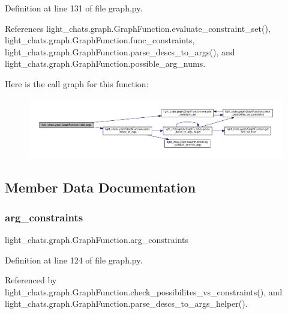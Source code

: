 Definition at line 131 of file graph.\+py.



References light\+\_\+chats.\+graph.\+Graph\+Function.\+evaluate\+\_\+constraint\+\_\+set(), light\+\_\+chats.\+graph.\+Graph\+Function.\+func\+\_\+constraints, light\+\_\+chats.\+graph.\+Graph\+Function.\+parse\+\_\+descs\+\_\+to\+\_\+args(), and light\+\_\+chats.\+graph.\+Graph\+Function.\+possible\+\_\+arg\+\_\+nums.

Here is the call graph for this function\+:
\nopagebreak
\begin{figure}[H]
\begin{center}
\leavevmode
\includegraphics[width=350pt]{classlight__chats_1_1graph_1_1GraphFunction_a8ac297dcadb1e5ec360f55f293dcbfcb_cgraph}
\end{center}
\end{figure}


\subsection{Member Data Documentation}
\mbox{\label{classlight__chats_1_1graph_1_1GraphFunction_a88e5637deee00b7f2f5d682afea0e85d}} 
\subsubsection{\texorpdfstring{arg\+\_\+constraints}{arg\_constraints}}
{\footnotesize\ttfamily light\+\_\+chats.\+graph.\+Graph\+Function.\+arg\+\_\+constraints}



Definition at line 124 of file graph.\+py.



Referenced by light\+\_\+chats.\+graph.\+Graph\+Function.\+check\+\_\+possibilites\+\_\+vs\+\_\+constraints(), and light\+\_\+chats.\+graph.\+Graph\+Function.\+parse\+\_\+descs\+\_\+to\+\_\+args\+\_\+helper().


